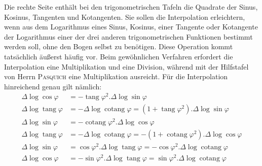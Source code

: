 Die rechte Seite enthält bei den trigonometrischen Tafeln die Quadrate der Sinus, Kosinus, Tangenten und Kotangenten. Sie sollen die Interpolation erleichtern, wenn aus dem Logarithmus eines Sinus, Kosinus, einer Tangente oder Kotangente der Logarithmus einer der drei anderen trigonometrischen Funktionen bestimmt werden soll, ohne den Bogen selbst zu benötigen. Diese Operation kommt tatsächlich äußerst häufig vor. Beim gewöhnlichen Verfahren erfordert die Interpolation eine Multiplikation und eine Division, während mit der Hilfstafel von Herrn \textsc{Pasquich} eine Multiplikation ausreicht. Für die Interpolation hinreichend genau gilt nämlich:
\[
\begin{aligned}
\Delta\log\cos\varphi&=-\operatorname{tang}\varphi^{2}.\Delta\log\sin\varphi\\
\Delta\log\operatorname{tang}\varphi&=-\Delta\log\operatorname{cotang}\varphi=(1+\operatorname{tang}\varphi^{2}).\Delta\log\sin\varphi\\
\Delta\log\sin\varphi&=-\operatorname{cotang}\varphi^{2}.\Delta\log\cos\varphi\\
\Delta\log\operatorname{tang}\varphi&=-\Delta\log\operatorname{cotang}\varphi=-(1+\operatorname{cotang}\varphi^{2}).\Delta\log\cos\varphi\\
\Delta\log\sin\varphi&=\cos\varphi^{2}.\Delta\log\operatorname{tang}\varphi=-\cos\varphi^{2}.\Delta\log\operatorname{cotang}\varphi\\
\Delta\log\cos\varphi&=-\sin\varphi^{2}.\Delta\log\operatorname{tang}\varphi=\sin\varphi^{2}.\Delta\log\operatorname{cotang}\varphi
\end{aligned}
\]
